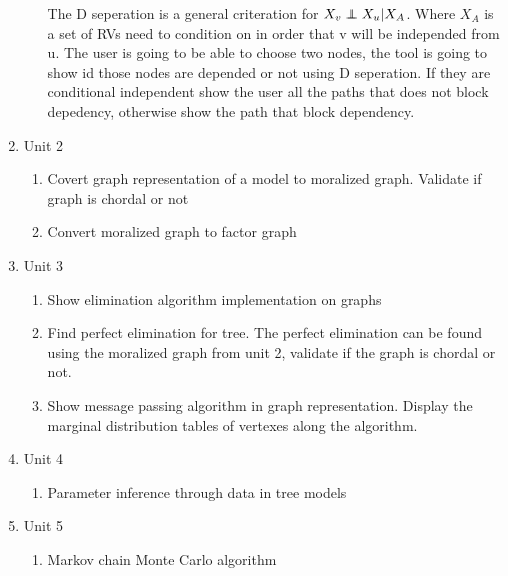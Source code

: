 \documentclass{article}
\newcommand\independent{\protect\mathpalette{\protect\independenT}{\perp}}
\def\independenT#1#2{\mathrel{\rlap{$#1#2$}\mkern2mu{#1#2}}}
\begin{document}
\begin{enumerate}
\begin{enumerate}
\begin{enumerate}
\begin{enumerate}
                \end{enumerate}
            \end{enumerate}
            The D seperation is a general criteration for $X_v \independent X_u | X_A$. Where $X_A$ is a set of RVs need to condition on in order that v will be independed
            from u.
            The user is going to be able to choose two nodes, the tool is going to show id those nodes are depended or not using D seperation. If they are conditional
            independent show the user all the paths that does not block depedency, otherwise show the path that block dependency.\\
        \end{enumerate}
        \item Unit 2\\
        \begin{enumerate}
            \item Covert graph representation of a model to moralized graph. Validate if graph is chordal or not
            \item Convert moralized graph to factor graph
        \end{enumerate}
        \item Unit 3\\
        \begin{enumerate}
            \item Show elimination algorithm implementation on graphs
            \item Find perfect elimination for tree. The perfect elimination can be found using the moralized graph from unit 2, validate if the graph is chordal or not.
            \item Show message passing algorithm in graph representation. Display the marginal distribution tables of vertexes along the algorithm.
        \end{enumerate}
        \item Unit 4\\
        \begin{enumerate}
            \item Parameter inference through data in tree models
        \end{enumerate}
        \item Unit 5\\
        \begin{enumerate}
            \item Markov chain Monte Carlo algorithm
        \end{enumerate}
    \end{enumerate}
\end{document}
